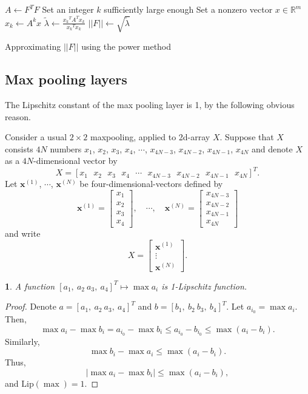\documentclass[12pt]{report}
\numberwithin{figure}{chapter}
\theoremstyle{plain}
\theoremstyle{definition}
\theoremstyle{corollary}
\theoremstyle{definition}
\theoremstyle{plain}
\theoremstyle{definition}
\theoremstyle{plain}
\newtheorem{lemma}[theorem]{\protect\lemmaname}
\providecommand{\lemmaname}{Lemma}
\newcommand\bx{\ensuremath{\boldsymbol x}}
\newcommand\lip{\ensuremath{\text{Lip}}}
\begin{document}
\begin{algorithm}
\(A\gets F^TF\)\;
Set an integer \(k\) sufficiently large enough\;
Set a nonzero vector \(x\in\mathbb R^m\)\;
\(x_k\gets A^kx\)\;
\(\tilde\lambda\gets\frac{{x_k}^TA^Tx_k}{{x_k}^Tx_k}\)\;
\(||F||\gets\sqrt{\tilde\lambda}\)
\caption{Approximating \(||F||\) using the power method}
\label{alg:2}
\end{algorithm}

\subsection{Max pooling layers}

The Lipschitz constant of the max pooling layer is 1, by the following obvious reason.

Consider a usual \(2\times 2\) maxpooling, applied to 2d-array \(X\).
Suppose that \(X\) consists \(4N\) numbers \(x_1\), \(x_2\), \(x_3\), \(x_4\), \(\cdots\), \(x_{4N-3}\), \(x_{4N-2}\), \(x_{4N-1}\), \(x_{4N}\) and denote \(X\) as a \(4N\)-dimensional vector by
\[X=[x_1\:\:\:x_2\:\:\:x_3\:\:\:x_4\:\:\:\cdots\:\:\:x_{4N-3}\:\:\:x_{4N-2}\:\:\:x_{4N-1}\:\:\:x_{4N}]^T.\]
Let \(\bx^{(1)}\), \(\cdots\), \(\bx^{(N)}\) be four-dimensional-vectors defined by
\[\bx^{(1)}=\begin{bmatrix}x_1\\x_2\\x_3\\x_4\end{bmatrix},\quad\cdots,\quad \bx^{(N)}=\begin{bmatrix}x_{4N-3}\\x_{4N-2}\\x_{4N-1}\\x_{4N}\end{bmatrix}\]
and write
\[X=\begin{bmatrix}\bx^{(1)}\\\vdots\\\bx^{(N)}\end{bmatrix}.\]

\begin{lemma}\label{lemm:maxs_1_lipschitz}
A function \([a_1,\:a_2\:a_3,\:a_4]^T\mapsto\max a_i\) is 1-Lipschitz function.
\end{lemma}
\begin{proof}
Denote \(a=[a_1,\:a_2\:a_3,\:a_4]^T\) and \(b=[b_1,\:b_2\:b_3,\:b_4]^T\).
Let \(a_{i_0}=\max a_i\).
Then,
\[\max a_i-\max b_i=a_{i_0}-\max b_i\le a_{i_0}-b_{i_0}\le\max (a_i-b_i).\]
Similarly, \[\max b_i-\max a_i\le\max (a_i-b_i).\]
Thus,
\[\left|\max a_i-\max b_i\right|\le\max (a_i-b_i),\]
and \(\lip(\max)=1\).
\end{proof}
\end{document}

